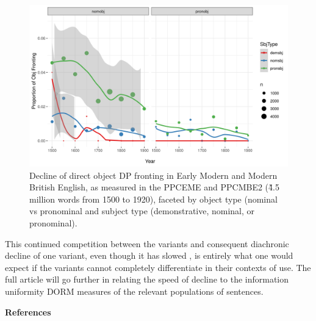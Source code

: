 \documentclass[12pt]{article}
\begin{document}
\begin{figure}
\centering
\includegraphics[scale=0.75]{objTop.png}
\caption{\small{Decline of direct object DP fronting in Early Modern and Modern British English, as measured in the PPCEME and PPCMBE2 (\~ 4.5 million words from 1500 to 1920), faceted by object type (nominal vs pronominal and subject type (demonstrative, nominal, or pronominal).}}
\label{decline}
\end{figure}

\noindent This continued competition between the variants and consequent diachronic decline of one variant, even though it has slowed \citep[as predicted in][]{wallenberg2016}, is entirely what one would expect if the variants cannot completely differentiate in their contexts of use. The full article will go further in relating the speed of decline to the information uniformity DORM measures of the relevant populations of sentences.

\vspace{-0.1em}

\begin{multicols}{2}
\noindent \textbf{References}
\vspace{-0.28em}
\renewcommand{\section}[2]{}

\setlength{\bibsep}{0.0pt}

\end{multicols}
\end{document}
